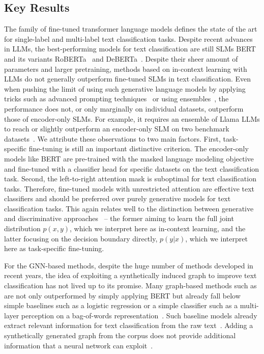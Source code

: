 \documentclass[acmsmall,nonacm]{acmart}
\newcommand{\GenLMs}{generative language models\xspace}
\newcommand{\SLM}{SLM\xspace}
\newcommand{\SLMs}{SLMs\xspace}
\newcommand{\LLMs}{LLMs\xspace}
\begin{document}
\subsection{Key Results}
The family of fine-tuned transformer language models defines the state of the art for single-label and multi-label text classification tasks.
Despite recent advances in \LLMs, the best-performing models for text classification are still \SLMs BERT and its variants RoBERTa~\cite{liu_roberta:_2019} and DeBERTa~\cite{he_deberta_2021}.
Despite their sheer amount of parameters and larger pretraining, methods based on in-context learning with \LLMs do not generally outperform fine-tuned \SLMs in text classification.
Even when pushing the limit of using such \GenLMs by applying tricks such as advanced prompting techniques~\cite{carp} or using ensembles~\cite{DBLP:journals/corr/abs-2402-07470-pushing-the-limit}, the performance does not, or only marginally on individual datasets, outperform those of encoder-only \SLMs. 
For example, it requires an ensemble of Llama \LLMs to reach or slightly outperform an encoder-only \SLM on two benchmark datasets~\cite{DBLP:journals/corr/abs-2402-07470-pushing-the-limit}.
We attribute these observations to two main factors.
First, task-specific fine-tuning is still an important distinctive criterion.
The encoder-only models like BERT are pre-trained with the masked language modeling objective and fine-tuned with a classifier head for specific datasets on the text classification task.
Second, the left-to-right attention mask is suboptimal for text classification tasks.
Therefore, fine-tuned models with unrestricted attention are effective text classifiers and should be preferred over purely generative models for text classification tasks.
This again relates well to the distinction between generative and discriminative approaches~\cite{DBLP:conf/sigir/Nallapati04} -- the former aiming to learn the full joint distribution $p(x,y)$, which we interpret here as in-context learning, and the latter focusing on the decision boundary directly, \ie $p(y|x)$, which we interpret here as task-specific fine-tuning.

For the GNN-based methods, despite the huge number of methods developed in recent years, the idea of exploiting a synthetically induced graph to improve text classification has not lived up to its promise.
Many graph-based methods such as \cite{DBLP:conf/aaai/YaoM019,DBLP:conf/aaai/LiuYZWL20,DBLP:conf/wsdm/RageshSIBL21} are not only outperformed by simply applying BERT but already fall below simple baselines such as a logistic regression or a simple classifier such as a multi-layer perception on a bag-of-words representation~\cite{galkescherp-acl2022,DBLP:conf/wsdm/RageshSIBL21}.
Such baseline models already extract relevant information for text classification from the raw text~\cite{DBLP:journals/csur/Sebastiani02}.
Adding a synthetically generated graph from the corpus does not provide additional information that a neural network can exploit~\cite{galkescherp-acl2022}.
\end{document}
